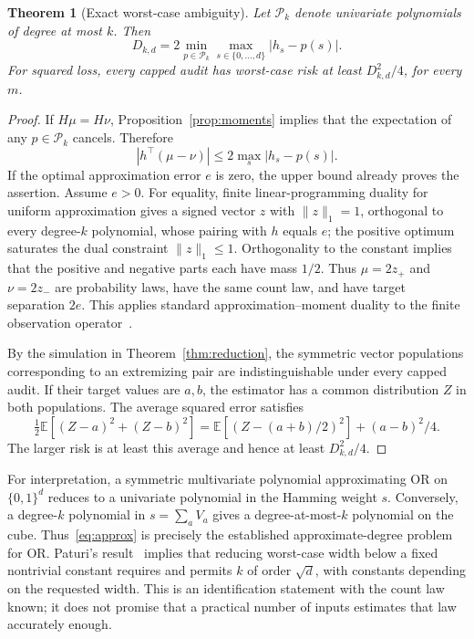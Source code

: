 \documentclass[conference]{IEEEtran}
\newtheorem{theorem}{Theorem}
\newcommand{\E}{\mathbb{E}}
\begin{document}
\begin{theorem}[Exact worst-case ambiguity]\label{thm:diameter}
Let $\mathcal P_k$ denote univariate polynomials of degree at most $k$. Then
\begin{equation}\label{eq:approx}
 D_{k,d}=2\min_{p\in\mathcal P_k}\max_{s\in\{0,\ldots,d\}}
             |h_s-p(s)|.
\end{equation}
For squared loss, every capped audit has worst-case risk at least $D_{k,d}^2/4$, for every $m$.
\end{theorem}
\begin{proof}
If $H\mu=H\nu$, Proposition~\ref{prop:moments} implies that the expectation of any $p\in\mathcal P_k$ cancels. Therefore
\[
 |h^\top(\mu-\nu)|\leq 2\max_s|h_s-p(s)|.
\]
If the optimal approximation error $e$ is zero, the upper bound already proves the assertion. Assume $e>0$. For equality, finite linear-programming duality for uniform approximation gives a signed vector $z$ with $\|z\|_1=1$, orthogonal to every degree-$k$ polynomial, whose pairing with $h$ equals $e$; the positive optimum saturates the dual constraint $\|z\|_1\leq1$. Orthogonality to the constant implies that the positive and negative parts each have mass $1/2$. Thus $\mu=2z_+$ and $\nu=2z_-$ are probability laws, have the same count law, and have target separation $2e$. This applies standard approximation--moment duality to the finite observation operator~\cite{wu}.

By the simulation in Theorem~\ref{thm:reduction}, the symmetric vector populations corresponding to an extremizing pair are indistinguishable under every capped audit. If their target values are $a,b$, the estimator has a common distribution $Z$ in both populations. The average squared error satisfies
\[
 \tfrac12\E[(Z-a)^2+(Z-b)^2]
 =\E[(Z-(a+b)/2)^2]+(a-b)^2/4.
\]
The larger risk is at least this average and hence at least $D_{k,d}^2/4$.
\end{proof}

For interpretation, a symmetric multivariate polynomial approximating OR on $\{0,1\}^d$ reduces to a univariate polynomial in the Hamming weight $s$. Conversely, a degree-$k$ polynomial in $s=\sum_a V_a$ gives a degree-at-most-$k$ polynomial on the cube. Thus~\eqref{eq:approx} is precisely the established approximate-degree problem for OR. Paturi's result~\cite{paturi} implies that reducing worst-case width below a fixed nontrivial constant requires and permits $k$ of order $\sqrt d$, with constants depending on the requested width. This is an identification statement with the count law known; it does not promise that a practical number of inputs estimates that law accurately enough.
\end{document}
